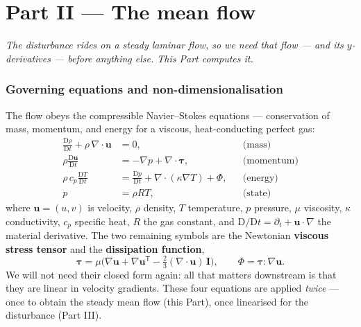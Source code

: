 \documentclass[11pt]{article}
\newcommand{\bridge}[1]{\par\noindent\textit{#1}\par\medskip}
\newcommand{\D}{\mathrm{D}}
\begin{document}
\part*{Part II --- The mean flow}
\bridge{The disturbance rides on a steady laminar flow, so we need that flow --- and its $y$-derivatives ---
before anything else. This Part computes it.}

\section{Governing equations and non-dimensionalisation}\label{sec:gov}
The flow obeys the compressible Navier--Stokes equations --- conservation of mass, momentum, and energy for
a viscous, heat-conducting perfect gas:
\begin{align}
  \frac{\D\rho}{\D t}+\rho\,\nabla\!\cdot\!\mathbf u &= 0, &&\text{(mass)}\label{eq:ns-mass}\\
  \rho\frac{\D\mathbf u}{\D t} &= -\nabla p+\nabla\!\cdot\!\boldsymbol\tau, &&\text{(momentum)}\label{eq:ns-mom}\\
  \rho\,c_p\frac{\D T}{\D t} &= \frac{\D p}{\D t}+\nabla\!\cdot(\kappa\nabla T)+\Phi, &&\text{(energy)}\label{eq:ns-energy}\\
  p &= \rho R T, &&\text{(state)}\label{eq:ns-state}
\end{align}
where $\mathbf u=(u,v)$ is velocity, $\rho$ density, $T$ temperature, $p$ pressure, $\mu$ viscosity,
$\kappa$ conductivity, $c_p$ specific heat, $R$ the gas constant, and $\D/\D t=\partial_t+\mathbf u\!\cdot\!\nabla$
the material derivative. The two remaining symbols are the Newtonian \textbf{viscous stress tensor} and the
\textbf{dissipation function},
\begin{equation}\label{eq:tauphi}
  \boldsymbol\tau=\mu\Big(\nabla\mathbf u+\nabla\mathbf u^{\mathsf T}-\tfrac23(\nabla\!\cdot\!\mathbf u)\,\mathbf I\Big),
  \qquad \Phi=\boldsymbol\tau\!:\!\nabla\mathbf u .
\end{equation}
We will not need their closed form again: all that matters downstream is that they are linear in velocity
gradients. These four equations are applied \emph{twice} --- once to obtain the steady mean flow (this
Part), once linearised for the disturbance (Part III).
\end{document}
